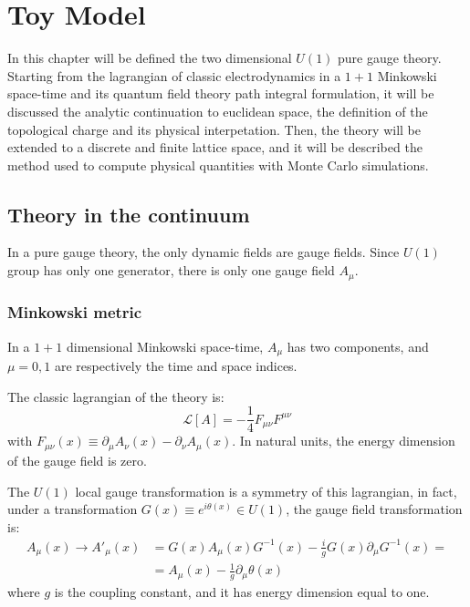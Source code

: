 \chapter{Toy Model}\label{ch:toy_model}

In this chapter will be defined the two dimensional $U(1)$ pure gauge theory.
Starting from the lagrangian of classic electrodynamics in a $1+1$ Minkowski space-time and its quantum field theory path integral formulation,
it will be discussed the analytic continuation to euclidean space, the definition of the topological charge and its physical interpetation.
Then, the theory will be extended to a discrete and finite lattice space, and it will be described the method used to compute physical quantities with Monte Carlo simulations.

\section{Theory in the continuum}

In a pure gauge theory, the only dynamic fields are gauge fields.
Since $U(1)$ group has only one generator, there is only one gauge field $A_\mu$.

\subsection*{Minkowski metric}

In a $1+1$ dimensional Minkowski space-time, $A_\mu$ has two components, and $\mu = 0, 1$ are respectively the time and space indices.

The classic lagrangian of the theory is:
\[
    \mathcal L[A] = -\frac{1}{4} F_{\mu\nu}F^{\mu\nu}
\]
with $F_{\mu\nu}(x) \equiv \partial_\mu A_\nu(x) - \partial_\nu A_\mu(x)$.
In natural units, the energy dimension of the gauge field is zero.

The $U(1)$ local gauge transformation is a symmetry of this lagrangian, in fact,
under a transformation $G(x) \equiv e^{i\theta(x)} \in U(1)$,
the gauge field transformation is:
\begin{align*}
    A_\mu(x) \rightarrow A'_\mu(x) &= G(x) A_\mu(x) G^{-1}(x) - \frac{i}{g} G(x) \partial_\mu G^{-1}(x) = \\
                                   &= A_\mu(x) - \frac{1}{g} \partial_\mu \theta(x)
\end{align*}
where $g$ is the coupling constant, and it has energy dimension equal to one.

